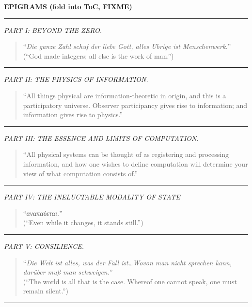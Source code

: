 \documentclass[letterpaper,draft]{memoir}
\begin{document}
\textbf{EPIGRAMS (fold into ToC, FIXME)}
\hrule
\emph{PART I: BEYOND THE ZERO.}
\begin{quote}
``\emph{Die ganze Zahl schuf der liebe Gott, alles Ubrige ist Menschenwerk.}''\\
(``God made integers; all else is the work of man.'')\\
\end{quote}
\hrule
\emph{PART II: THE PHYSICS OF INFORMATION.}
\begin{quote}
``All things physical are information-theoretic in origin, and this is a
participatory universe. Observer participancy gives rise to information; and
information gives rise to physics.''\\
\end{quote}
\hrule
\emph{PART III: THE ESSENCE AND LIMITS OF COMPUTATION.}
\begin{quote}
``All physical systems can be thought of as registering and processing
 information, and how one wishes to define computation will determine your view
 of what computation consists of.''\\
\end{quote}
\hrule
\emph{PART IV: THE INELUCTABLE MODALITY OF STATE}
\begin{quote}``\emph{ αναπαύεται\latintext.}''\\
(``Even while it changes, it stands still.'')\\
\end{quote}
\hrule
\emph{PART V: CONSILIENCE.}
\begin{quote}``\emph{Die Welt ist alles, was der Fall ist\ldots Wovon man nicht sprechen kann, darüber muß man schweigen.}''\\
(``The world is all that is the case. Whereof one cannot speak, one must remain silent.'')\\
\end{quote}
\hrule
\clearpage
\end{document}
